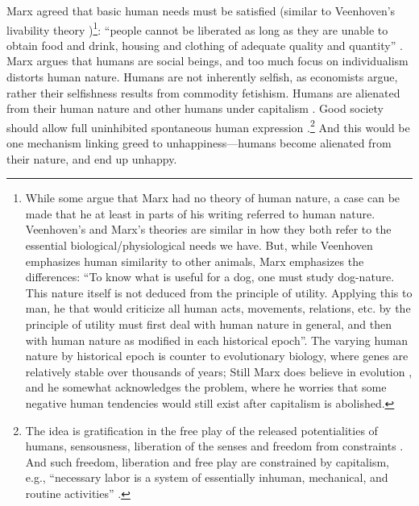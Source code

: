 \documentclass[10pt, letterpaper]{article}
\begin{document}
\begin{spacing}{1.8}
Marx agreed that basic human needs must be satisfied (similar to Veenhoven's livability theory \citep{veenhoven14b})\footnote{While some
  argue that Marx had no theory of human nature, a case can be made that he at least in parts of his writing referred to human nature. 
%
  Veenhoven's and Marx's theories are similar in how they both refer to the essential biological/physiological needs we have. But, while Veenhoven emphasizes human similarity to other animals, Marx
emphasizes the differences: ``To know what is useful for a dog, one must study dog-nature. This nature
itself is not deduced from the principle of utility. Applying this to man, he that would criticize all human acts, movements, relations, etc. by the principle
of utility must first deal with human nature in general, and then with human
nature as modified in each historical epoch''\citep[quoted in][p. 83]{struhl16}. 
The varying human nature by historical epoch is counter to evolutionary biology, where genes are relatively
stable over thousands of years; Still Marx does believe in  evolution \citep{heyer82},
and he somewhat acknowledges the problem, where he
worries that some negative human tendencies would still exist after capitalism is abolished.}: ``people cannot be
liberated as long as they are unable to obtain food and drink, housing and clothing of adequate quality and quantity'' \citep[cited in][p. 70]{geras83}.
Marx argues that humans are social beings, and too much focus on individualism
distorts human nature. %
Humans are not inherently selfish, as economists argue, rather their selfishness results from commodity fetishism. %
Humans are alienated from their human nature and other humans under capitalism \citep{byron16,petrovic63}. %
Good society should allow full uninhibited spontaneous human expression %
\citep{marcuse15}.\footnote{The idea is gratification in the free play of the
  released potentialities of humans, sensousness, liberation of the senses and
  freedom from constraints \citep{marcuse15}. And such freedom, liberation and
  free play are constrained by capitalism, e.g., ``necessary labor is a system of
  essentially inhuman, mechanical, and routine activities''
  \citep[][p. 195]{marcuse15}.} 
%
And this would be one mechanism linking greed  to unhappiness---humans become alienated from their nature, and end up unhappy. 


\end{spacing}
\end{document}
